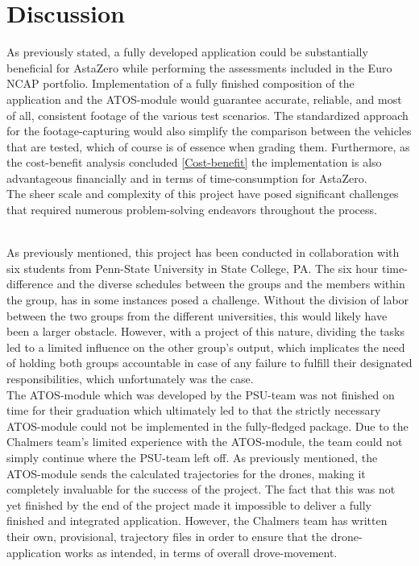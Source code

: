 \chapter{Discussion}

As previously stated, a fully developed application could be substantially beneficial for AstaZero while performing the assessments included in the Euro NCAP portfolio. Implementation of a fully finished composition of the application and the ATOS-module would guarantee accurate, reliable, and most of all, consistent footage of the various test scenarios. The standardized approach for the footage-capturing would also simplify the comparison between the vehicles that are tested, which of course is of essence when grading them. Furthermore, as the cost-benefit analysis concluded \ref{Cost-benefit} the implementation is also advantageous financially and in terms of time-consumption for AstaZero. 
\\

The sheer scale and complexity of this project have posed significant challenges that required numerous problem-solving endeavors throughout the process.

\\


As previously mentioned, this project has been conducted in collaboration with six students from Penn-State University in State College, PA. The six hour time-difference and the diverse schedules between the groups and the members within the group, has in some instances posed a challenge. Without the division of labor between the two groups from the different universities, this would likely have been a larger obstacle. However, with a project of this nature, dividing the tasks led to a limited influence on the other group's output, which implicates the need of holding both groups accountable in case of any failure to fulfill their designated responsibilities, which unfortunately was the case. 
\\

The ATOS-module which was developed by the PSU-team was not finished on time for their graduation which ultimately led to that the strictly necessary ATOS-module could not be implemented in the fully-fledged package. Due to the Chalmers team's limited experience with the ATOS-module, the team could not simply continue where the PSU-team left off. As previously mentioned, the ATOS-module sends the calculated trajectories for the drones, making it completely invaluable for the success of the project. The fact that this was not yet finished by the end of the project made it impossible to deliver a fully finished and integrated application. However, the Chalmers team has written their own, provisional, trajectory files in order to ensure that the drone-application works as intended, in terms of overall drove-movement. 
\\

